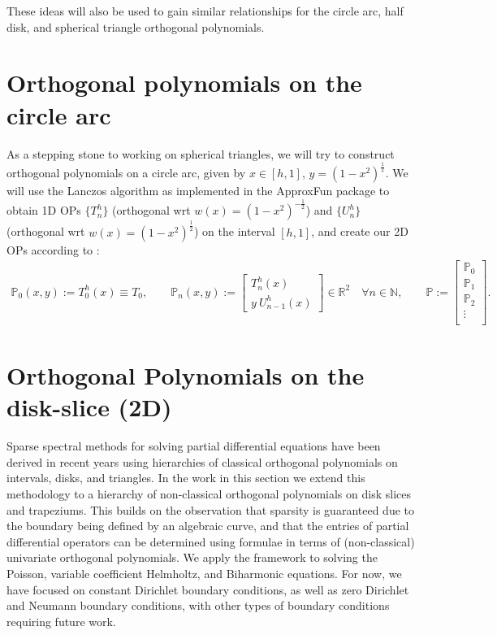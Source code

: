 \documentclass[11pt, oneside]{article}   	%
\newcommand{\R}{\mathbb{R}}
\newcommand{\N}{\mathbb{N}}
\newcommand{\bigP}{\mathbb{P}}
\begin{document}
These ideas will also be used to gain similar relationships for the circle arc, half disk, and spherical triangle orthogonal polynomials.


\section{Orthogonal polynomials on the circle arc}

As a stepping stone to working on spherical triangles, we will try to construct orthogonal polynomials on a circle arc, given by $x \in [h, 1]$, $y = (1-x^2)^\frac{1}{2}$. We will use the Lanczos algorithm as implemented in the ApproxFun package \cite{ApproxFun} to obtain 1D OPs $\{T^h_n\}$ (orthogonal wrt $w(x) = (1-x^2)^{-\frac{1}{2}}$) and $\{U^h_n\}$ (orthogonal wrt $w(x) = (1-x^2)^{\frac{1}{2}}$) on the interval $[h,1]$, and create our 2D OPs according to \cite{huybrechs2010fourier}:
\begin{align}
\bigP_0(x,y) := T^h_0(x) \equiv T_0,
\quad \quad 
\bigP_n(x,y) := \begin{bmatrix}
		T^h_n(x) \\
		y \: U^h_{n-1}(x)
	\end{bmatrix} \in \R^2 \quad \forall n \in \N,
\quad \quad 
\bigP := \begin{bmatrix}
		\bigP_0 \\
		\hline
		\bigP_1 \\
		\hline
		\bigP_2 \\
		\vdots \\
	\end{bmatrix}.
\end{align}





\section{Orthogonal Polynomials on the disk-slice (2D)}

Sparse spectral methods for solving partial differential equations have been derived in recent years using hierarchies of classical orthogonal polynomials on intervals, disks, and triangles. In the work in this section we extend this methodology to a hierarchy of non-classical orthogonal polynomials on disk slices and trapeziums. This builds on the observation that sparsity is guaranteed due to the boundary being defined by an algebraic curve, and that the entries of partial differential operators can be determined using formulae in terms of (non-classical) univariate orthogonal polynomials. We apply the framework to solving the Poisson, variable coefficient Helmholtz, and Biharmonic equations. For now, we have focused on constant Dirichlet boundary conditions, as well as zero Dirichlet and Neumann boundary conditions, with other types of boundary conditions requiring future work.
\end{document}
